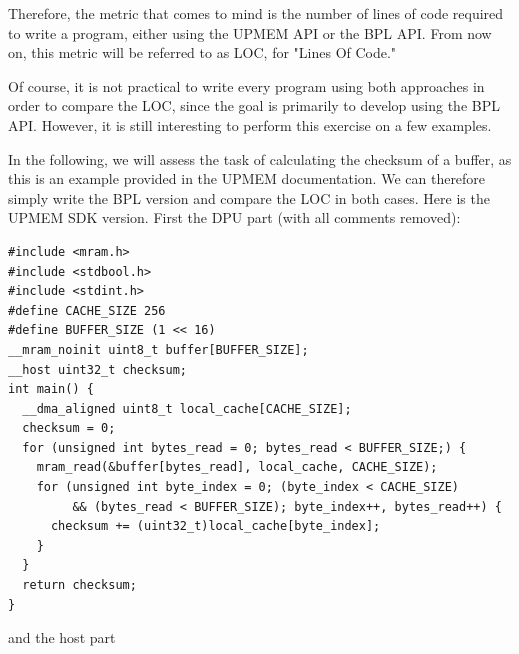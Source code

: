 Therefore, the metric that comes to mind is the number of lines of code required to write a program, either using the UPMEM API or the BPL API.
From now on, this metric will be referred to as LOC, for "Lines Of Code."

Of course, it is not practical to write every program using both approaches in order to compare the LOC, since the goal is primarily to develop using the BPL API. However, it is still interesting to perform this exercise on a few examples.

In the following, we will assess the task of calculating the checksum of a buffer, as this is an example provided in the UPMEM documentation. We can therefore simply write the BPL version and compare the LOC in both cases.
Here is the UPMEM SDK version. First the DPU part (with all comments removed):

\begin{verbatim}
#include <mram.h>
#include <stdbool.h>
#include <stdint.h>
#define CACHE_SIZE 256
#define BUFFER_SIZE (1 << 16)
__mram_noinit uint8_t buffer[BUFFER_SIZE];
__host uint32_t checksum;
int main() {
  __dma_aligned uint8_t local_cache[CACHE_SIZE];
  checksum = 0;
  for (unsigned int bytes_read = 0; bytes_read < BUFFER_SIZE;) {
    mram_read(&buffer[bytes_read], local_cache, CACHE_SIZE);
    for (unsigned int byte_index = 0; (byte_index < CACHE_SIZE) 
         && (bytes_read < BUFFER_SIZE); byte_index++, bytes_read++) {
      checksum += (uint32_t)local_cache[byte_index];
    }
  }
  return checksum;
}
\end{verbatim}

and the host part


